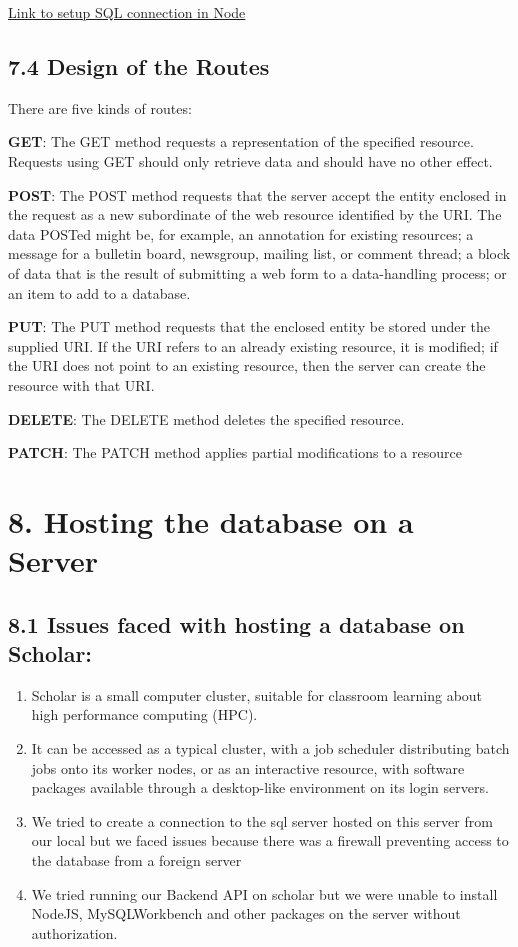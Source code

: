 \documentclass[]{book}
\providecommand{\tightlist}{%
  \setlength{\itemsep}{0pt}\setlength{\parskip}{0pt}}
\begin{document}
\href{https://bezkoder.com/node-js-rest-api-express-mysql/}{Link to
setup SQL connection in Node}

\subsection{7.4 Design of the Routes}\label{design-of-the-routes-1}

There are five kinds of routes:

\textbf{GET}: The GET method requests a representation of the specified
resource. Requests using GET should only retrieve data and should have
no other effect.

\textbf{POST}: The POST method requests that the server accept the
entity enclosed in the request as a new subordinate of the web resource
identified by the URI. The data POSTed might be, for example, an
annotation for existing resources; a message for a bulletin board,
newsgroup, mailing list, or comment thread; a block of data that is the
result of submitting a web form to a data-handling process; or an item
to add to a database.

\textbf{PUT}: The PUT method requests that the enclosed entity be stored
under the supplied URI. If the URI refers to an already existing
resource, it is modified; if the URI does not point to an existing
resource, then the server can create the resource with that URI.

\textbf{DELETE}: The DELETE method deletes the specified resource.

\textbf{PATCH}: The PATCH method applies partial modifications to a
resource

\section{8. Hosting the database on a
Server}\label{hosting-the-database-on-a-server-1}

\subsection{8.1 Issues faced with hosting a database on
Scholar:}\label{issues-faced-with-hosting-a-database-on-scholar-1}

\begin{enumerate}
\def\labelenumi{\arabic{enumi}.}
\tightlist
\item
  Scholar is a small computer cluster, suitable for classroom learning
  about high performance computing (HPC).
\item
  It can be accessed as a typical cluster, with a job scheduler
  distributing batch jobs onto its worker nodes, or as an interactive
  resource, with software packages available through a desktop-like
  environment on its login servers.
\item
  We tried to create a connection to the sql server hosted on this
  server from our local but we faced issues because there was a firewall
  preventing access to the database from a foreign server
\item
  We tried running our Backend API on scholar but we were unable to
  install NodeJS, MySQLWorkbench and other packages on the server
  without authorization.
\end{enumerate}
\end{document}
